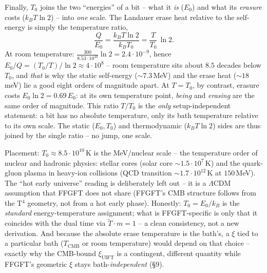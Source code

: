 Finally, $T_0$ joins the two \enquote{energies} of a bit -- what it \emph{is} ($E_0$) and what its
\emph{erasure} costs ($k_B T\ln2$) -- into \emph{one} scale. The Landauer erase heat relative to the
self-energy is simply the temperature ratio,
\[
\frac{Q}{E_0}=\frac{k_B T\ln2}{k_B T_0}=\frac{T}{T_0}\,\ln 2.
\]
At room temperature: $\tfrac{300}{8.53\cdot10^{10}}\ln2=2.4\cdot10^{-9}$, hence
$E_0/Q=(T_0/T)/\ln2\approx4\cdot10^{8}$ -- room temperature sits about $8.5$ decades below $T_0$, and
\emph{that} is why the static self-energy ($\sim7.3$\,MeV) and the erase heat ($\sim18$\,meV) lie a good
eight orders of magnitude apart. At $T=T_0$, by contrast, erasure costs $E_0\ln2=0.69\,E_0$: at its own
temperature point, \emph{being} and \emph{erasing} are the same order of magnitude. This ratio $T/T_0$ is
the \emph{only} setup-independent statement: a bit has no absolute temperature, only its bath temperature
relative to its own scale. The static ($E_0,T_0$) and thermodynamic ($k_B T\ln2$) sides are thus joined by
the single ratio -- no jump, one scale.

Placement: $T_0\approx8.5\cdot10^{10}$\,K is the MeV/nuclear scale -- the temperature order of nuclear and
hadronic physics: stellar cores (solar core $\sim1.5\cdot10^7$\,K) and the quark-gluon plasma in heavy-ion
collisions (QCD transition $\sim1.7\cdot10^{12}$\,K at $150$\,MeV). The \enquote{hot early universe}
reading is deliberately left out -- it is a $\Lambda$CDM assumption that FFGFT does not share (FFGFT's CMB
structure follows from the T$^4$ geometry, not from a hot early phase). Honestly:
$T_0=E_0/k_B$ is the \emph{standard} energy-temperature assignment; what is FFGFT-specific is only that it
coincides with the dual time via $\tilde T\cdot m=1$ -- a clean consistency, not a new derivation. And
because the absolute erase temperature is the bath's, a $\xi$ tied to a particular bath ($T_\text{CMB}$ or
room temperature) would depend on that choice -- exactly why the CMB-bound $\xi_\text{UIFT}$ is a
contingent, different quantity while FFGFT's geometric $\xi$ stays bath-\emph{independent} (\S9).

